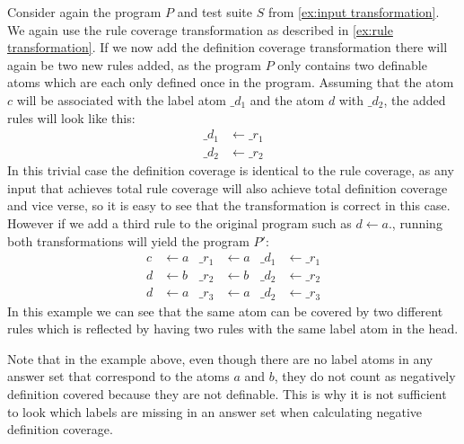 \begin{example}
\label{ex:definition transformation}
    Consider again the program $P$ and test suite $S$ from \cref{ex:input transformation}. We again use the rule coverage transformation as described in \cref{ex:rule transformation}. If we now add the definition coverage transformation there will again be two new rules added, as the program $P$ only contains two definable atoms which are each only defined once in the program. Assuming that the atom $c$ will be associated with the label atom $\_d_1$ and the atom $d$ with $\_d_2$, the added rules will look like this:
    \begin{align*}
        \_d_1 &\leftarrow \_r_1 \\
        \_d_2 &\leftarrow \_r_2
    \end{align*}
    In this trivial case the definition coverage is identical to the rule coverage, as any input that achieves total rule coverage will also achieve total definition coverage and vice verse, so it is easy to see that the transformation is correct in this case. However if we add a third rule to the original program such as \(d \leftarrow a.\), running both transformations will yield the program $P'$:
    \begin{align*}
        c &\leftarrow a      &  \_r_1 &\leftarrow a      &  \_d_1 &\leftarrow \_r_1 \\
        d &\leftarrow b      &  \_r_2 &\leftarrow b      &  \_d_2 &\leftarrow \_r_2 \\
        d &\leftarrow a      &  \_r_3 &\leftarrow a      &  \_d_2 &\leftarrow \_r_3 
    \end{align*}
    In this example we can see that the same atom can be covered by two different rules which is reflected by having two rules with the same label atom in the head.
\end{example}

Note that in the example above, even though there are no label atoms in any answer set that correspond to the atoms $a$ and $b$, they do not count as negatively definition covered because they are not definable. This is why it is not sufficient to look which labels are missing in an answer set when calculating negative definition coverage. 

